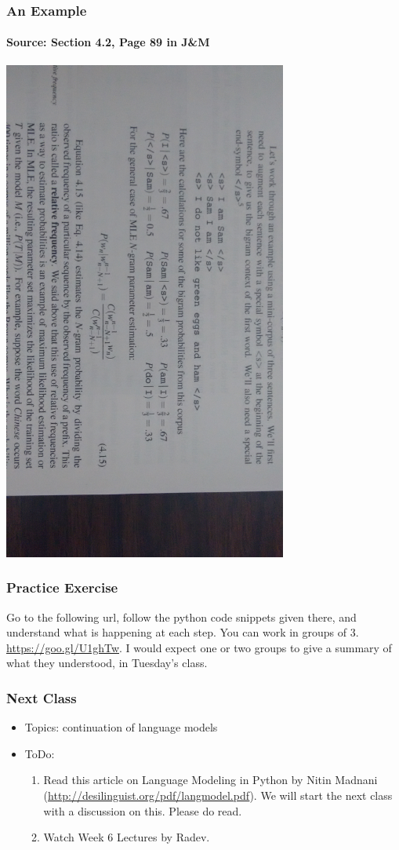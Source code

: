 \documentclass{beamer}
\begin{document}
\begin{frame}
\frametitle{An Example}
\framesubtitle{Source: Section 4.2, Page 89 in J\&M}
\includegraphics[width=0.7\textwidth,angle=90]{ngramprobs.jpg}
\end{frame}

\begin{frame}
\frametitle{Practice Exercise}
Go to the following url, follow the python code snippets given there, and understand what is happening at each step. You can work in groups of 3. \url{https://goo.gl/U1ghTw}. I would expect one or two groups to give a summary of what they understood, in Tuesday's class.
\end{frame}

\begin{frame}
\frametitle{Next Class}
\begin{itemize}
\item Topics: continuation of language models
\item ToDo:
\begin{enumerate}
\item Read this article on Language Modeling in Python by Nitin Madnani (\url{http://desilinguist.org/pdf/langmodel.pdf}). We will start the next class with a discussion on this. Please do read.
\item Watch Week 6 Lectures by Radev.
\end{enumerate}
\end{itemize}
\end{frame}
\end{document}
